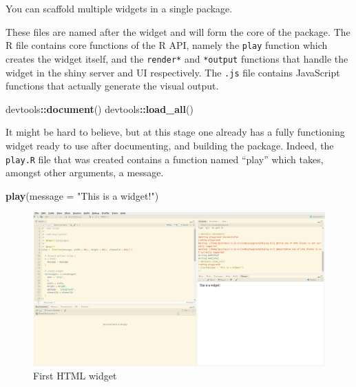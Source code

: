 \documentclass[
]{krantz}
\makeatletter
\newenvironment{Shaded}{\begin{snugshade}}{\end{snugshade}}
\newcommand{\DataTypeTok}[1]{\textcolor[rgb]{0.27,0.27,0.27}{#1}}
\newcommand{\KeywordTok}[1]{\textcolor[rgb]{0.27,0.27,0.27}{\textbf{#1}}}
\newcommand{\NormalTok}[1]{#1}
\newcommand{\OperatorTok}[1]{\textcolor[rgb]{0.43,0.43,0.43}{\textbf{#1}}}
\newcommand{\StringTok}[1]{\textcolor[rgb]{0.5,0.5,0.5}{#1}}
\newenvironment{kframe}{%
\medskip{}
\setlength{\fboxsep}{.8em}
 \def\at@end@of@kframe{}%
 \ifinner\ifhmode%
  \def\at@end@of@kframe{\end{minipage}}%
  \begin{minipage}{\columnwidth}%
 \fi\fi%
 \def\FrameCommand##1{\hskip\@totalleftmargin \hskip-\fboxsep
 \colorbox{shadecolor}{##1}\hskip-\fboxsep
     \hskip-\linewidth \hskip-\@totalleftmargin \hskip\columnwidth}%
 \MakeFramed {\advance\hsize-\width
   \@totalleftmargin\z@ \linewidth\hsize
   \@setminipage}}%
 {\par\unskip\endMakeFramed%
 \at@end@of@kframe}
\renewenvironment{Shaded}{\begin{kframe}}{\end{kframe}}
\newenvironment{rmdblock}[1]
  {
  \begin{itemize}
  \renewcommand{\labelitemi}{
    \raisebox{-.7\height}[0pt][0pt]{
      {\setkeys{Gin}{width=3em,keepaspectratio}\texttt{[image: images/\#1]}}
    }
  }
  \setlength{\fboxsep}{1em}
  \begin{kframe}
  \item
  }
  {
  \end{kframe}
  \end{itemize}
  }
\newenvironment{rmdnote}
  {\begin{rmdblock}{note}}
  {\end{rmdblock}}
\makeatother
\begin{document}
\begin{rmdnote}
You can scaffold multiple widgets in a single package.
\end{rmdnote}

These files are named after the widget and will form the core of the package. The R file contains core functions of the R API, namely the \texttt{play} function which creates the widget itself, and the \texttt{render*} and \texttt{*output} functions that handle the widget in the shiny server and UI respectively. The \texttt{.js} file contains JavaScript functions that actually generate the visual output.

\begin{Shaded}
\begin{Highlighting}[]
\NormalTok{devtools}\OperatorTok{::}\KeywordTok{document}\NormalTok{()}
\NormalTok{devtools}\OperatorTok{::}\KeywordTok{load\_all}\NormalTok{()}
\end{Highlighting}
\end{Shaded}

It might be hard to believe, but at this stage one already has a fully functioning widget ready to use after documenting, and building the package. Indeed, the \texttt{play.R} file that was created contains a function named ``play'' which takes, amongst other arguments, a message.

\begin{Shaded}
\begin{Highlighting}[]
\KeywordTok{play}\NormalTok{(}\DataTypeTok{message =} \StringTok{"This is a widget!"}\NormalTok{)}
\end{Highlighting}
\end{Shaded}

\begin{figure}
\centering
\includegraphics{images/playground-1.png}
\caption{First HTML widget}
\end{figure}
\end{document}
